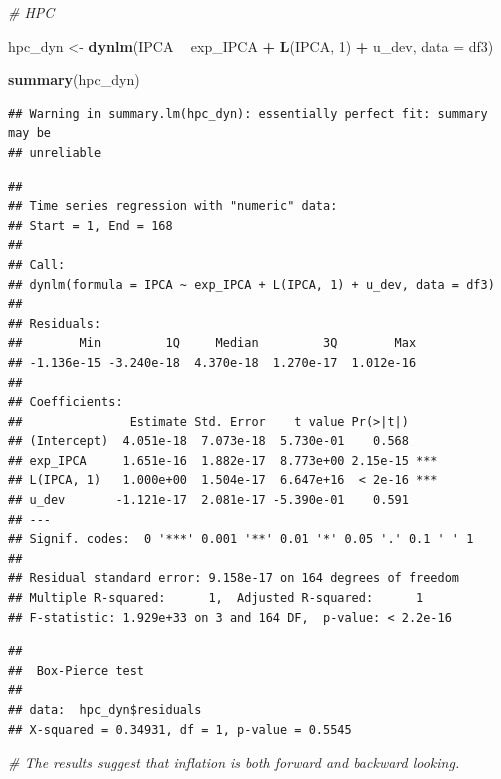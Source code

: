 \documentclass[
]{article}
\newenvironment{Shaded}{\begin{snugshade}}{\end{snugshade}}
\newcommand{\CommentTok}[1]{\textcolor[rgb]{0.56,0.35,0.01}{\textit{#1}}}
\newcommand{\DataTypeTok}[1]{\textcolor[rgb]{0.13,0.29,0.53}{#1}}
\newcommand{\DecValTok}[1]{\textcolor[rgb]{0.00,0.00,0.81}{#1}}
\newcommand{\KeywordTok}[1]{\textcolor[rgb]{0.13,0.29,0.53}{\textbf{#1}}}
\newcommand{\NormalTok}[1]{#1}
\newcommand{\OperatorTok}[1]{\textcolor[rgb]{0.81,0.36,0.00}{\textbf{#1}}}
\newcommand{\StringTok}[1]{\textcolor[rgb]{0.31,0.60,0.02}{#1}}
\begin{document}
\begin{Shaded}
\begin{Highlighting}[]
\CommentTok{# HPC }

\NormalTok{hpc_dyn <-}\StringTok{ }\KeywordTok{dynlm}\NormalTok{(IPCA }\OperatorTok{~}\StringTok{ }\NormalTok{exp_IPCA }\OperatorTok{+}\StringTok{ }\KeywordTok{L}\NormalTok{(IPCA, }\DecValTok{1}\NormalTok{) }\OperatorTok{+}\StringTok{ }\NormalTok{u_dev, }\DataTypeTok{data =}\NormalTok{ df3)}

\KeywordTok{summary}\NormalTok{(hpc_dyn)}
\end{Highlighting}
\end{Shaded}

\begin{verbatim}
## Warning in summary.lm(hpc_dyn): essentially perfect fit: summary may be
## unreliable
\end{verbatim}

\begin{verbatim}
## 
## Time series regression with "numeric" data:
## Start = 1, End = 168
## 
## Call:
## dynlm(formula = IPCA ~ exp_IPCA + L(IPCA, 1) + u_dev, data = df3)
## 
## Residuals:
##        Min         1Q     Median         3Q        Max 
## -1.136e-15 -3.240e-18  4.370e-18  1.270e-17  1.012e-16 
## 
## Coefficients:
##               Estimate Std. Error    t value Pr(>|t|)    
## (Intercept)  4.051e-18  7.073e-18  5.730e-01    0.568    
## exp_IPCA     1.651e-16  1.882e-17  8.773e+00 2.15e-15 ***
## L(IPCA, 1)   1.000e+00  1.504e-17  6.647e+16  < 2e-16 ***
## u_dev       -1.121e-17  2.081e-17 -5.390e-01    0.591    
## ---
## Signif. codes:  0 '***' 0.001 '**' 0.01 '*' 0.05 '.' 0.1 ' ' 1
## 
## Residual standard error: 9.158e-17 on 164 degrees of freedom
## Multiple R-squared:      1,  Adjusted R-squared:      1 
## F-statistic: 1.929e+33 on 3 and 164 DF,  p-value: < 2.2e-16
\end{verbatim}

\begin{Shaded}
\end{Shaded}

\begin{verbatim}
## 
##  Box-Pierce test
## 
## data:  hpc_dyn$residuals
## X-squared = 0.34931, df = 1, p-value = 0.5545
\end{verbatim}

\begin{Shaded}
\begin{Highlighting}[]
\CommentTok{# The results suggest that inflation is both forward and backward looking.}
\end{Highlighting}
\end{Shaded}
\end{document}
